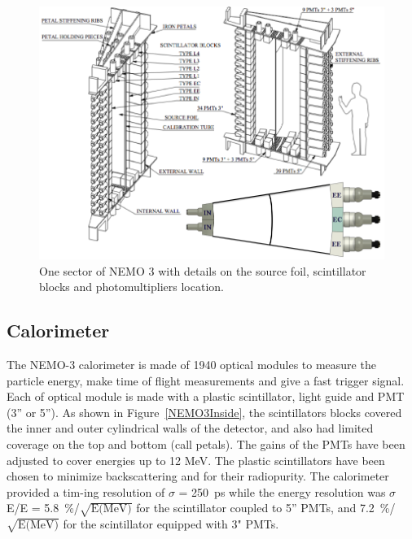 \documentclass[main.tex]{subfiles}
\begin{document}
\begin{figure}[h!]
\begin{center}
\includegraphics[scale=0.34]{pictures/Chap3/SectorDetailedPMTconfig.png}
\caption{One sector of NEMO 3 with details on the source foil, scintillator blocks and photomultipliers location.}
\label{SectorDetailedPMTconfig}
\end{center}
\end{figure}







\newpage

\newpage

\newpage

\newpage




\FloatBarrier





\subsection{Calorimeter}


\NI The NEMO-3 calorimeter is made of 1940 optical modules to measure the particle energy, make time of flight measurements and give a fast trigger signal. Each of optical module is made with a plastic scintillator, light guide and PMT (3'' or 5''). As shown in Figure~\ref{NEMO3Inside},  the scintillators blocks covered the inner and outer cylindrical walls of the detector, and also had limited coverage on the top and bottom (call petals). The gains of the PMTs have been adjusted to cover energies up to 12 MeV. The plastic scintillators have been chosen to minimize backscattering and for their radiopurity. The  calorimeter  provided  a  tim-ing  resolution  of $\sigma$ = 250~ps  while  the  energy  resolution  was $\sigma$E/E = 5.8~\%/$\sqrt{\text{E(MeV)}}$  for  the  scintillator coupled to 5'' PMTs, and 7.2~\%/$\sqrt{\text{E(MeV)}}$ for the scintillator equipped with 3" PMTs. 
\end{document}
